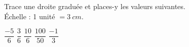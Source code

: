%
%
Trace une droite graduée et places-y les valeurs suivantes.\\
  Échelle : 1 unité $=\SI{3}{cm}$.
  \begin{tasks}
    \task  $\dfrac{- 5}{6}$
    \task  $\dfrac{3}{6}$
    \task  $\dfrac{10}{6}$
    \task  $\dfrac{100}{50}$
    \task  $\dfrac{- 1}{3}$
  \end{tasks}
